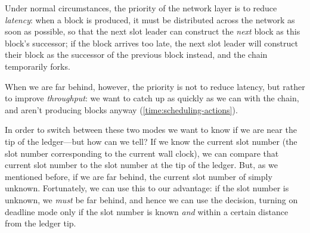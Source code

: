 Under normal circumstances, the priority of the network layer is to reduce
\emph{latency}: when a block is produced, it must be distributed across the
network as soon as possible, so that the next slot leader can construct the
\emph{next} block as this block's successor; if the block arrives too late,
the next slot leader will construct their block as the successor of the previous
block instead, and the chain temporarily forks.

When we are far behind, however, the priority is not to reduce latency, but
rather to improve \emph{throughput}: we want to catch up as quickly as we can
with the chain, and aren't producing blocks anyway
(\cref{time:scheduling-actions}).

In order to switch between these two modes we want to know if we are near the
tip of the ledger---but how can we tell? If we know the current slot number
(the slot number corresponding to the current wall clock), we can compare
that current slot number to the slot number at the tip of the ledger. But,
as we mentioned before, if we are far behind, the current slot number of
simply unknown. Fortunately, we can use this to our advantage: if the
slot number is unknown, we \emph{must} be far behind, and hence we can use
the decision, turning on deadline mode only if the slot number is known
\emph{and} within a certain distance from the ledger tip.
